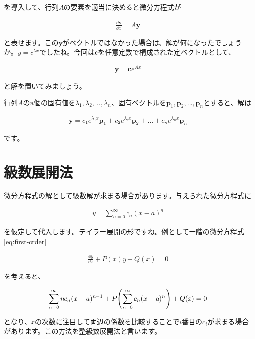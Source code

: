 \noindent
を導入して、行列$A$の要素を適当に決めると微分方程式が

\begin{eqnarray}
    \frac{\dd \boldsymbol{y}}{\dd x}=A\boldsymbol{y}
    \label{eq:multiple-y}
\end{eqnarray}

\noindent
と表せます。この$\boldsymbol{y}$がベクトルではなかった場合は、解が何になったでしょうか。$y=e^{\lambda x}$でしたね。今回は$\boldsymbol{c}$を任意定数で構成された定ベクトルとして、

\begin{eqnarray}
    \boldsymbol{y}=\boldsymbol{c}e^{A x}
\end{eqnarray}

\noindent
と解を置いてみましょう。

行列$A$の$n$個の固有値を$\lambda_1,\lambda_2,\dots,\lambda_n$、固有ベクトルを$\boldsymbol{p}_1,\boldsymbol{p}_2,\dots,\boldsymbol{p}_n$とすると、解は

\begin{eqnarray}
    \boldsymbol{y}=c_1e^{\lambda_1 x}\boldsymbol{p}_1+c_2e^{\lambda_2 x}\boldsymbol{p}_2+\dots+c_ne^{\lambda_n x}\boldsymbol{p}_n
\end{eqnarray}

\noindent
です。






\section{級数展開法}
\label{expansion}
微分方程式の解として級数解が求まる場合があります。与えられた微分方程式に

\begin{eqnarray}
    y=\sum_{n=0}^\infty c_n(x-a)^n
\end{eqnarray}

\noindent
を仮定して代入します。テイラー展開の形ですね。例として一階の微分方程式\ref{eq:first-order}

\begin{eqnarray}
    \frac{\dd y}{\dd x}+P(x)y+Q(x)=0 \nonumber
\end{eqnarray}

\noindent
を考えると、

\begin{eqnarray}
    \sum_{n=0}^\infty nc_n(x-a)^{n-1}+P\pqty{\sum_{n=0}^\infty c_n(x-a)^n}+Q(x)=0
\end{eqnarray}

\noindent
となり、$x$の次数に注目して両辺の係数を比較することで$i$番目の$c_i$が求まる場合があります。この方法を整級数展開法と言います。


